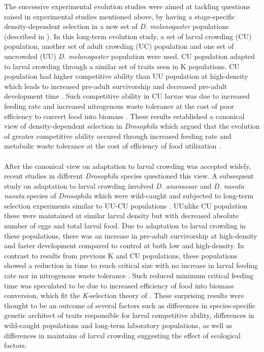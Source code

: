 The successive experimental evolution studies were aimed at tackling questions raised in experimental studies mentioned above, by having a stage-specific density-dependent selection in a new set of \textit{D. melanogaster} populations (described in \cite{joshiDirectionalStabilizingDensityDependent1993}). In this long-term evolution study, a set of larval crowding (CU) population, another set of adult crowding (UC) population and one set of uncrowded (UU) \textit{D. melanogaster} population were used. CU population adapted to larval crowding through a similar set of traits seen in K populations. CU population had higher competitive ability than UU population at high-density which leads to increased pre-adult survivorship and decreased pre-adult development time \citep{borashPatternsSelectionStress2001,joshiDirectionalStabilizingDensityDependent1993,santosDensityDependentNaturalSelection1997}. Such competitive ability in CU larvae was due to increased feeding rate and increased nitrogenous waste tolerance at the cost of poor efficiency to convert food into biomass \citep{borashGeneticPolymorphismMaintained1998,joshiDensitydependentNaturalSelection1996,shiotsuguSymmetryCorrelatedSelection1997}. These results established a canonical view of density-dependent selection in \textit{Drosophila} which argued that the evolution of greater competitive ability occured through increased feeding rate and metabolic waste tolerance at the cost of efficiency of food utilization \citep{joshiKselectionAselectionEffectiveness2001}. \\\\
After the canonical view on adaptation to larval crowding was accepted widely, recent studies in different \textit{Drosophila} species questioned this view. A subsequent study on adaptation to larval crowding involved \textit{D. ananassae} and \textit{D. nasuta nasuta} species of \textit{Drosophila} which were wild-caught and subjected to long-term selection experiments similar to UU-CU populations \citep{nagarajanAdaptationLarvalCrowding2016}. UUnlike CU population these were maintained at similar larval density but with decreased absolute number of eggs and total larval food. Due to adaptation to larval crowding in these populations, there was an increase in pre-adult survivorship at high-density and faster development compared to control at both low and high-density. In contrast to results from previous K and CU populations, these populations showed a reduction in time to reach critical size with no increase in larval feeding rate nor in nitrogenous waste tolerance \citep{nagarajanAdaptationLarvalCrowding2016}. Such reduced minimum critical feeding time was speculated to be due to increased efficiency of food into biomass conversion, which fit the \textit{K}-selection theory of \citet*{macarthurTheoryIslandBiogeography1967}. These surprising results were thought to be an outcome of several factors such as differences in species-specific genetic architect of traits responsible for larval competitive ability, differences in wild-caught populations and long-term laboratory populations, as well as differences in maintains of larval crowding suggesting the effect of ecological factors.\\\\
